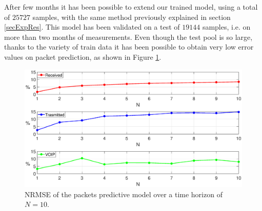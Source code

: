 After few months it has been possible to extend our trained model, using a total of $25727$ samples, with the same method previously explained in section \ref{secExpRes}. This model has been validated on a test of $19144$ samples, i.e. on more than two months of measurements. Even though the test pool is so large, thanks to the variety of train data it has been possible to obtain very low error values on packet prediction, as shown in Figure \ref{fig:{LONGTEST_Pescara}}.

\begin{figure}[h!]
	\centering
	\includegraphics[trim={120 0 120 0}, width=1\linewidth]{figure/LONGTEST_PESCARA.eps}
	\caption{NRMSE of the packets predictive model over a time horizon of $N=10$.}
	\label{fig:{LONGTEST_Pescara}}
\end{figure}